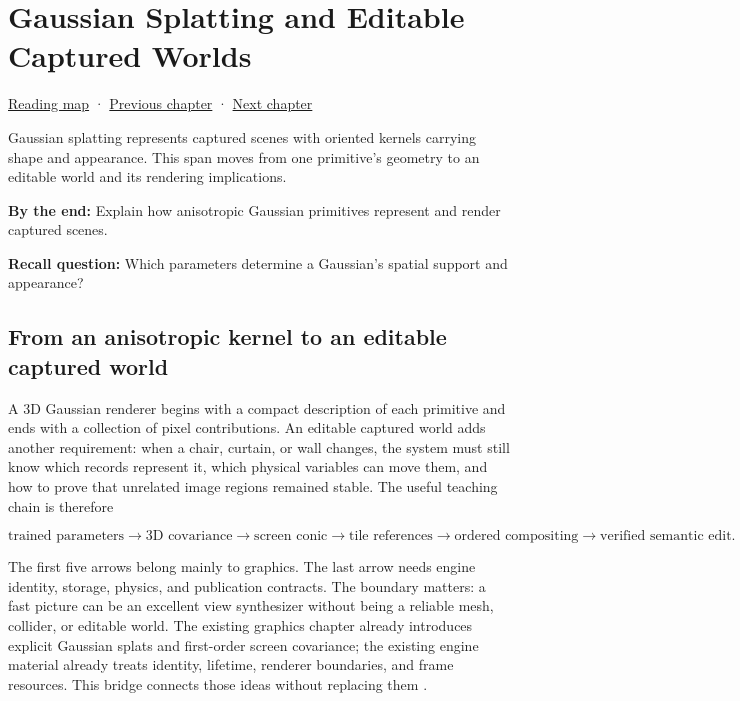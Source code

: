 \chapter{Gaussian Splatting and Editable Captured Worlds}\label{04-visual-computing-ii-ch037-gaussian-splatting-and-editable-captured-worlds}\hypertarget{04-visual-computing-ii-ch037}{}\label{stagechapter:04-visual-computing-ii-ch037}

\hypertarget{04-visual-computing-ii-ch037-gaussian-splatting-and-editable-captured-worlds}{}

\hyperref[volume-reading-map]{Reading map} · \hyperref[04-visual-computing-ii-ch036-source-atlas-and-reconstruction-checkpoints]{Previous chapter} · \hyperref[04-visual-computing-ii-ch038-projecting-ellipsoids-into-screen-space-conics]{Next chapter}

Gaussian splatting represents captured scenes with oriented kernels carrying shape and appearance. This span moves from one primitive's geometry to an editable world and its rendering implications.

\textbf{By the end:} Explain how anisotropic Gaussian primitives represent and render captured scenes.

\textbf{Recall question:} Which parameters determine a Gaussian's spatial support and appearance?

\section{From an anisotropic kernel to an editable captured world}\label{04-visual-computing-ii-ch037-from-an-anisotropic-kernel-to-an-editable-captured-world}

\hypertarget{04-visual-computing-ii-ch037-from-an-anisotropic-kernel-to-an-editable-captured-world}{}

A 3D Gaussian renderer begins with a compact description of each primitive and ends with a collection of pixel contributions. An editable captured world adds another requirement: when a chair, curtain, or wall changes, the system must still know which records represent it, which physical variables can move them, and how to prove that unrelated image regions remained stable. The useful teaching chain is therefore

\[
\text{trained parameters}
\to \text{3D covariance}
\to \text{screen conic}
\to \text{tile references}
\to \text{ordered compositing}
\to \text{verified semantic edit}.
\]

The first five arrows belong mainly to graphics. The last arrow needs engine identity, storage, physics, and publication contracts. The boundary matters: a fast picture can be an excellent view synthesizer without being a reliable mesh, collider, or editable world. The existing graphics chapter already introduces explicit Gaussian splats and first-order screen covariance; the existing engine material already treats identity, lifetime, renderer boundaries, and frame resources. This bridge connects those ideas without replacing them .


